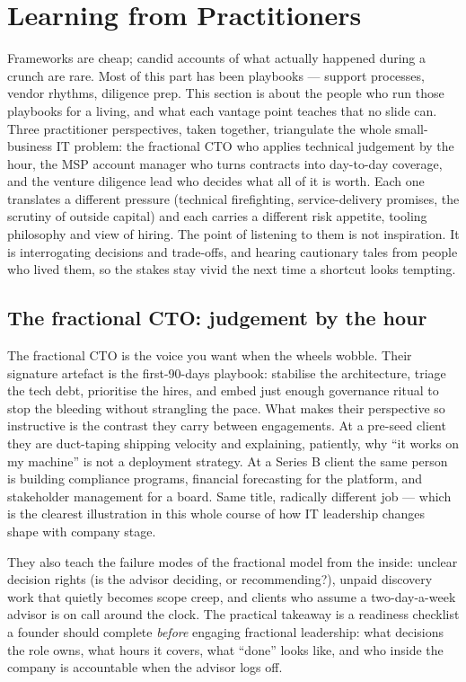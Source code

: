 \section{Learning from Practitioners}
Frameworks are cheap; candid accounts of what actually happened during a crunch are rare. Most of this part has been playbooks — support processes, vendor rhythms, diligence prep. This section is about the people who run those playbooks for a living, and what each vantage point teaches that no slide can. Three practitioner perspectives, taken together, triangulate the whole small-business IT problem: the fractional CTO who applies technical judgement by the hour, the MSP account manager who turns contracts into day-to-day coverage, and the venture diligence lead who decides what all of it is worth. Each one translates a different pressure (technical firefighting, service-delivery promises, the scrutiny of outside capital) and each carries a different risk appetite, tooling philosophy and view of hiring. The point of listening to them is not inspiration. It is interrogating decisions and trade-offs, and hearing cautionary tales from people who lived them, so the stakes stay vivid the next time a shortcut looks tempting.



\subsection{The fractional CTO: judgement by the hour}


The fractional CTO is the voice you want when the wheels wobble. Their signature artefact is the first-90-days playbook: stabilise the architecture, triage the tech debt, prioritise the hires, and embed just enough governance ritual to stop the bleeding without strangling the pace. What makes their perspective so instructive is the contrast they carry between engagements. At a pre-seed client they are duct-taping shipping velocity and explaining, patiently, why ``it works on my machine'' is not a deployment strategy. At a Series B client the same person is building compliance programs, financial forecasting for the platform, and stakeholder management for a board. Same title, radically different job — which is the clearest illustration in this whole course of how IT leadership changes shape with company stage.


They also teach the failure modes of the fractional model from the inside: unclear decision rights (is the advisor deciding, or recommending?), unpaid discovery work that quietly becomes scope creep, and clients who assume a two-day-a-week advisor is on call around the clock. The practical takeaway is a readiness checklist a founder should complete \emph{before} engaging fractional leadership: what decisions the role owns, what hours it covers, what ``done'' looks like, and who inside the company is accountable when the advisor logs off.



